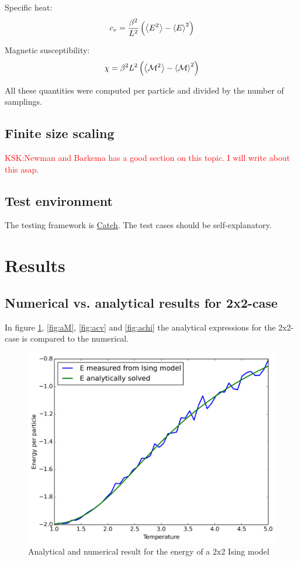 \documentclass[11pt,a4paper,english,draft]{article}
\numberwithin{equation}{section}
\newcommand{\magM}{\mathcal{M}}
\newcommand{\figurewidth}{.85\textwidth}
\begin{document}
Specific heat:
\begin{equation}
c_v = \frac{\beta^2}{L^2}\left(\expval{E^2} - \expval{E}^2\right)
\end{equation}

Magnetic susceptibility:
\begin{equation}
\chi = \beta^2 L^2 \left(\expval{\magM^2} - \expval{\magM}^2\right)
\end{equation}

All these quantities were computed per particle and divided by the number 
of samplings.

\subsection{Finite size scaling}
\textcolor{red}{KSK:Newman and Barkema has a good section on this topic. I will write about this asap.} 

\subsection{Test environment}

The testing framework is \href{https://github.com/philsquared/Catch}{Catch}.
The test cases should be self-explanatory.


\section{Results}

\subsection{Numerical vs. analytical results for 2x2-case}

In figure \ref{fig:aE}, \ref{fig:aM}, \ref{fig:acv} and \ref{fig:achi}
the analytical expressions for the 2x2-case is compared to the numerical.

\begin{figure}
\centering
\includegraphics[width=\figurewidth]{pics/pics4report/aE.png}
\caption{Analytical and numerical result for the energy 
of a 2x2 Ising model}
\label{fig:aE}
\end{figure}
\end{document}
